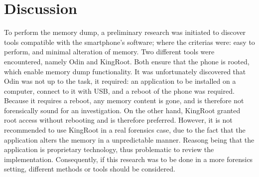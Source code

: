 \section{Discussion}
To perform the memory dump, a preliminary research was initiated to discover tools compatible with the smartphone's software; where the criterias were: easy to perform, and minimal alteration of memory. Two different tools were encountered, namely Odin and KingRoot. Both ensure that the phone is rooted, which enable memory dump functionality.
It was unfortunately discovered that Odin was not up to the task, it required: an application to be installed on a computer, connect to it with USB, and a reboot of the phone was required. Because it requires a reboot, any memory content is gone, and is therefore not forensically sound for an investigation. On the other hand, KingRoot granted root access without rebooting and is therefore preferred. However, it is not recommended to use KingRoot in a real forensics case, due to the fact that the application alters the memory in a unpredictable manner. Reasong being that the application is proprietary technology, thus problematic to review the implementation. Consequently, if this research was to be done in a more forensics setting, different methods or tools should be considered. 
